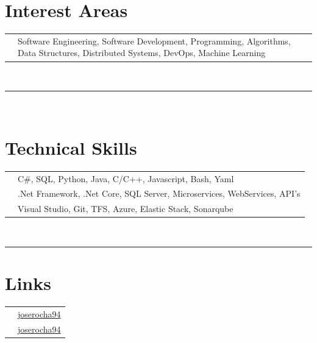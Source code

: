 \documentclass[oneside]{article}
\begin{document}
{\begin{minipage}[t][\textheight-2\fboxsep-2\fboxrule][t]{\dimexpr0.4\textwidth-2\fboxrule-2\fboxsep\relax}
        \section*{\normalsize Interest Areas}
        \begin{tabularx}{\textwidth}{cY}
            \faInfo{} & \small Software Engineering, Software Development, Programming, Algorithms, Data Structures, Distributed Systems, DevOps, Machine Learning \\
        \end{tabularx}
        \vspace{0.5cm} \\
        \rule{\linewidth}{0.4pt}
        
        \vspace{0.3 cm} \\
        \section*{\normalsize Technical Skills}
        \begin{tabularx}{\textwidth}{cY}
            \faCode{} & \small C\#, SQL, Python, Java, C/C++, Javascript, Bash, Yaml \\
            \faLaptopCode{} & \small .Net Framework, .Net Core, SQL Server, Microservices, WebServices, API's \\
            \faToolbox{} & \small Visual Studio, Git, TFS, Azure, Elastic Stack, Sonarqube
        \end{tabularx}
        \vspace{0.5cm} \\
        \rule{\linewidth}{0.4pt}

        \section*{\normalsize Links}
        \begin{tabular}{cl}
            \faLinkedin{} & \small \href{https://www.linkedin.com/in/joserocha94/}{joserocha94} \\
            \faGithub{} & \small \href{https://github.com/joserocha94}{joserocha94} \\
        \end{tabular}
        \vspace{0.5cm} \\
 
    \end{minipage}
}
\end{document}
